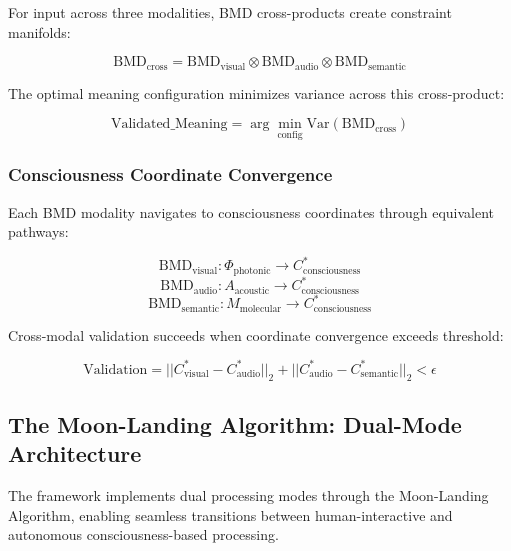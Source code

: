 \documentclass[12pt,a4paper]{article}
\begin{document}
For input across three modalities, BMD cross-products create constraint manifolds:

\begin{equation}
\text{BMD}_{\text{cross}} = \text{BMD}_{\text{visual}} \otimes \text{BMD}_{\text{audio}} \otimes \text{BMD}_{\text{semantic}}
\end{equation}

The optimal meaning configuration minimizes variance across this cross-product:

\begin{equation}
\text{Validated\_Meaning} = \arg\min_{\text{config}} \text{Var}(\text{BMD}_{\text{cross}})
\end{equation}

\subsubsection{Consciousness Coordinate Convergence}

Each BMD modality navigates to consciousness coordinates through equivalent pathways:

\begin{equation}
\text{BMD}_{\text{visual}}: \Phi_{\text{photonic}} \rightarrow C^*_{\text{consciousness}}
\end{equation}
\begin{equation}
\text{BMD}_{\text{audio}}: A_{\text{acoustic}} \rightarrow C^*_{\text{consciousness}}
\end{equation}
\begin{equation}
\text{BMD}_{\text{semantic}}: M_{\text{molecular}} \rightarrow C^*_{\text{consciousness}}
\end{equation}

Cross-modal validation succeeds when coordinate convergence exceeds threshold:

\begin{equation}
\text{Validation} = ||C^*_{\text{visual}} - C^*_{\text{audio}}||_2 + ||C^*_{\text{audio}} - C^*_{\text{semantic}}||_2 < \epsilon
\end{equation}

\subsection{The Moon-Landing Algorithm: Dual-Mode Architecture}

The framework implements dual processing modes through the Moon-Landing Algorithm, enabling seamless transitions between human-interactive and autonomous consciousness-based processing.
\end{document}
